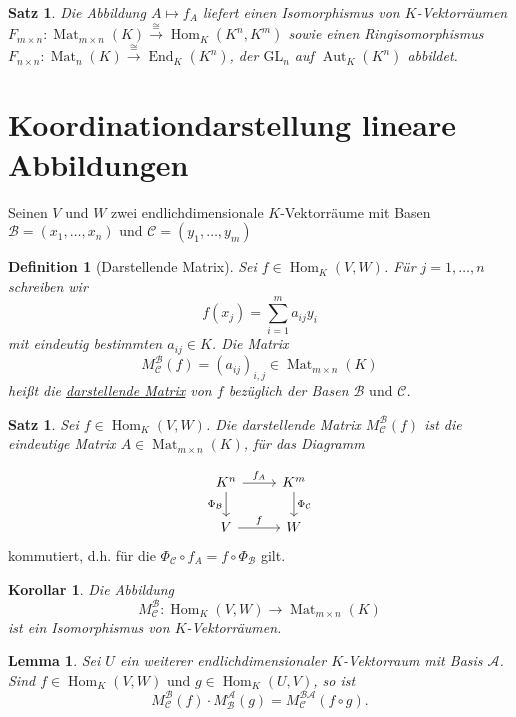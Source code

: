 \documentclass[ngerman,a4paper]{report}
\theoremstyle{changebreak}
\newtheorem{corollar}[theorem]{Korollar}
\newtheorem{lemma}[theorem]{Lemma}
\newtheorem{satz}[theorem]{Satz}
\newtheorem{definition}[theorem]{Definition}
\newcommand{\begriff}[2][]{\uline{#2}\index{#1#2}}
\DeclareMathOperator{\Mat}{Mat}
\DeclareMathOperator{\End}{End}
\DeclareMathOperator{\aut}{Aut}
\DeclareMathOperator{\Hom}{Hom}
\begin{document}
\begin{satz}
	Die Abbildung $A\mapsto f_A$ liefert einen Isomorphismus von $K$-Vektorräumen $F_{m\times n}: \Mat_{m\times n}(K)\overset{\cong}{\longrightarrow}\Hom_K(K^n, K^m)$ sowie einen Ringisomorphismus $F_{n\times n}: \Mat_n(K) \overset{\cong}{\longrightarrow}\End_K(K^n)$, der $\text{GL}_n$ auf $\aut_K(K^n)$ abbildet.
\end{satz}

\section{Koordinationdarstellung lineare Abbildungen}

Seinen $V$ und $W$ zwei endlichdimensionale $K$-Vektorräume mit Basen $\mathcal{B} = (x_1,\dots,x_n) \text{ und } \mathcal{C} = (y_1,\dots,y_m)$

\begin{definition}[Darstellende Matrix]
    Sei $f \in \Hom_K(V,W)$. Für $j=1,\dots,n$ schreiben wir
    \[
    f(x_j) = \sum_{i=1}^{m}a_{ij}y_i
    \]
    mit eindeutig bestimmten $a_{ij} \in K$. Die Matrix
    \[
    M_{\mathcal{C}}^{\mathcal{B}}(f) = (a_{ij})_{i,j} \in \Mat_{m\times n}(K)
    \]
    heißt die \begriff{darstellende Matrix} von $f$ bezüglich der Basen $\mathcal{B} \text{ und } \mathcal{C}$.
\end{definition}

\begin{satz}
    Sei $f \in \Hom_K(V,W)$. Die darstellende Matrix $M_{\mathcal{C}}^{\mathcal{B}}(f)$ ist die eindeutige Matrix $A \in \Mat_{m\times n}(K)$, für das Diagramm
\end{satz}

\[
    \begin{tikzcd}
        K^n \arrow{r}{f_A} \arrow[swap]{d}{\Phi_\mathcal{B}} & K^m \arrow{d}{\Phi_\mathcal{C}} \\%
        V \arrow{r}{f}& W
    \end{tikzcd}
\]
kommutiert, d.h. für die $\Phi_\mathcal{C} \circ f_A = f \circ \Phi_\mathcal{B}$ gilt.

\begin{corollar}
	Die Abbildung
    \[
    M_{\mathcal{C}}^{\mathcal{B}}\colon \Hom_K(V,W) \longrightarrow \Mat_{m\times n}(K)
    \]
    ist ein Isomorphismus von $K$-Vektorräumen.
\end{corollar}

\begin{lemma}
    Sei $U$ ein weiterer endlichdimensionaler $K$-Vektorraum mit Basis $\mathcal{A}$. Sind $f \in \Hom_K(V,W) \text{ und } g \in \Hom_K(U,V)$, so ist
    \[
    M_{\mathcal{C}}^{\mathcal{B}}(f)\cdot M_{\mathcal{B}}^{\mathcal{A}}(g)= M_{\mathcal{C}}^{\mathcal{BA}}(f\circ g).
    \]
\end{lemma}
\end{document}
